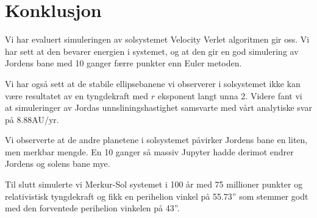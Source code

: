 \documentclass[reprint,english,notitlepage]{revtex4-1}
\begin{document}
\section{Konklusjon} %
	Vi har evaluert simuleringen av solsystemet Velocity Verlet algoritmen gir oss. Vi har sett at den bevarer energien i systemet, og at den gir en god simulering av Jordens bane med 10 ganger færre punkter enn Euler metoden.
	
	Vi har også sett at de stabile ellipsebanene vi observerer i solsystemet ikke kan være resultatet av en tyngdekraft med $r$ eksponent langt unna 2. Videre fant vi at simuleringer av Jordas unnsliningshastighet samsvarte med vårt analytiske svar på 8.88AU/yr.
	
	Vi observerte at de andre planetene i solsystemet påvirker Jordens bane en liten, men merkbar mengde. En 10 ganger så massiv Jupyter hadde derimot endrer Jordens og solens bane mye.
	
	Til slutt simulerte vi Merkur-Sol systemet i 100 år med 75 millioner punkter og relativistisk tyngdekraft og fikk en perihelion vinkel på 55.73'' som stemmer godt med den forventede perihelion vinkelen på 43''.

\begin{figure}  \end{figure}
	
\end{document}
